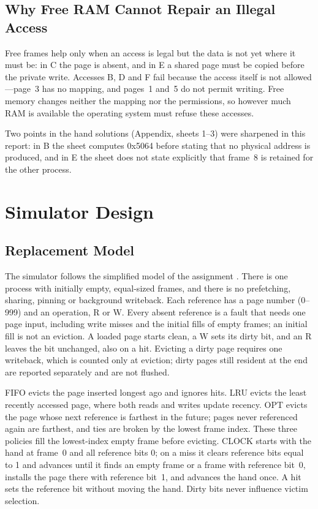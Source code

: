 \documentclass[conference,a4paper]{IEEEtran}
\begin{document}
\subsection{Why Free RAM Cannot Repair an Illegal Access}
Free frames help only when an access is legal but the data is not yet where it must be: in C the page is absent, and in E a shared page must be copied before the private write. Accesses B, D and F fail because the access itself is not allowed---page~3 has no mapping, and pages~1 and~5 do not permit writing. Free memory changes neither the mapping nor the permissions, so however much RAM is available the operating system must refuse these accesses.

Two points in the hand solutions (Appendix, sheets 1--3) were sharpened in this report: in B the sheet computes 0x5064 before stating that no physical address is produced, and in E the sheet does not state explicitly that frame~8 is retained for the other process.

\section{Simulator Design}\label{sec:design}
\subsection{Replacement Model}
The simulator follows the simplified model of the assignment \cite{handout}. There is one process with initially empty, equal-sized frames, and there is no prefetching, sharing, pinning or background writeback. Each reference has a page number (0--999) and an operation, R or W. Every absent reference is a fault that needs one page input, including write misses and the initial fills of empty frames; an initial fill is not an eviction. A loaded page starts clean, a W sets its dirty bit, and an R leaves the bit unchanged, also on a hit. Evicting a dirty page requires one writeback, which is counted only at eviction; dirty pages still resident at the end are reported separately and are not flushed.

FIFO evicts the page inserted longest ago and ignores hits. LRU evicts the least recently accessed page, where both reads and writes update recency. OPT evicts the page whose next reference is farthest in the future; pages never referenced again are farthest, and ties are broken by the lowest frame index. These three policies fill the lowest-index empty frame before evicting. CLOCK starts with the hand at frame~0 and all reference bits 0; on a miss it clears reference bits equal to 1 and advances until it finds an empty frame or a frame with reference bit~0, installs the page there with reference bit~1, and advances the hand once. A hit sets the reference bit without moving the hand. Dirty bits never influence victim selection.
\end{document}
